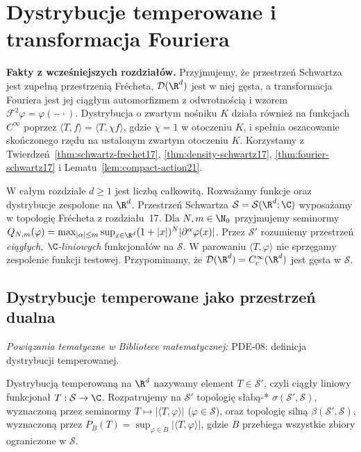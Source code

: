 \setcounter{section}{21}
\section{Dystrybucje temperowane i transformacja Fouriera}
\label{sec:temperowane22}

\providecommand{\atlasref}[2]{#2}


\noindent\textbf{Fakty z wcześniejszych rozdziałów.}
Przyjmujemy, że przestrzeń Schwartza jest zupełną przestrzenią Frécheta,
$\mathcal D(\R^d)$ jest w niej gęsta, a transformacja Fouriera
jest jej ciągłym automorfizmem z odwrotnością i wzorem
$\mathcal F^2\varphi=\varphi(-\cdot)$.
Dystrybucja o zwartym nośniku $K$ działa również na funkcjach
$C^\infty$ poprzez $\langle T,f\rangle=\langle T,\chi f\rangle$,
gdzie $\chi=1$ w otoczeniu $K$, i spełnia oszacowanie
skończonego rzędu na ustalonym zwartym otoczeniu $K$.
Korzystamy z Twierdzeń~\ref{thm:schwartz-frechet17},
\ref{thm:density-schwartz17}, \ref{thm:fourier-schwartz17}
i Lematu~\ref{lem:compact-action21}.

W całym rozdziale $d\ge1$ jest liczbą całkowitą.
Rozważamy funkcje oraz dystrybucje zespolone na $\R^d$.
Przestrzeń Schwartza $\mathcal S=\mathcal S(\R^d;\C)$
wyposażamy w topologię Frécheta z rozdziału~17.
Dla $N,m\in\N_0$ przyjmujemy seminormy
$Q_{N,m}(\varphi)=\max_{|\alpha|\le m}\sup_{x\in\R^d}
(1+|x|)^N|\partial^\alpha\varphi(x)|$.
Przez $\mathcal S'$ rozumiemy przestrzeń \emph{ciągłych,
$\C$-liniowych} funkcjonałów na $\mathcal S$.
W parowaniu $\langle T,\varphi\rangle$ nie sprzęgamy zespolenie
funkcji testowej. Przypominamy, że
$\mathcal D(\R^d)=C_c^\infty(\R^d)$ jest gęsta w $\mathcal S$.

\subsection{Dystrybucje temperowane jako przestrzeń dualna}

\noindent\emph{Powiązania tematyczne w Bibliotece matematycznej:} \atlasref{PDE-08::def:pde8-tempered}{PDE-08: definicja dystrybucji temperowanej}.


\begin{definicja}
\label{def:tempered22}
Dystrybucją temperowaną na $\R^d$ nazywamy element
$T\in\mathcal S'$, czyli ciągły liniowy funkcjonał
$T:\mathcal S\to\C$. Rozpatrujemy na $\mathcal S'$ topologię
słabą-* $\sigma(\mathcal S',\mathcal S)$, wyznaczoną przez
seminormy $T\mapsto|\langle T,\varphi\rangle|$
($\varphi\in\mathcal S$), oraz topologię silną
$\beta(\mathcal S',\mathcal S)$, wyznaczoną przez
$P_B(T)=\sup_{\varphi\in B}|\langle T,\varphi\rangle|$,
gdzie $B$ przebiega wszystkie zbiory ograniczone w $\mathcal S$.
\end{definicja}

